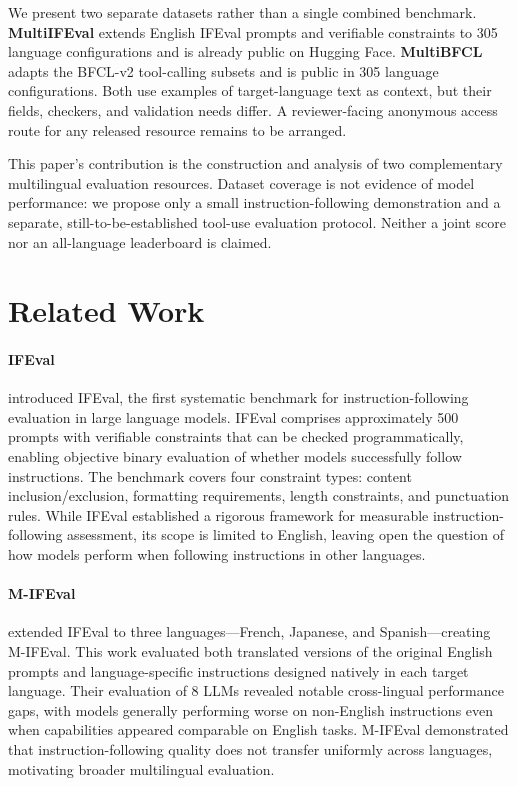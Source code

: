 \documentclass[11pt]{article}
\begin{document}
We present two separate datasets rather than a single combined benchmark.
\textbf{MultiIFEval} extends English IFEval prompts and verifiable constraints to
305 language configurations and is already public on Hugging Face.
\textbf{MultiBFCL} adapts the BFCL-v2 tool-calling subsets and is public in
305 language configurations. Both use examples of target-language text as
context, but their fields, checkers, and validation needs differ. A reviewer-facing
anonymous access route for any released resource remains to be arranged.

This paper's contribution is the construction and analysis of two complementary
multilingual evaluation resources. Dataset coverage is not evidence of model
performance: we propose only a small instruction-following demonstration and a
separate, still-to-be-established tool-use evaluation protocol. Neither a joint
score nor an all-language leaderboard is claimed.


\section{Related Work}
\label{sec:related-work}

\paragraph{IFEval}
\cite{zhou2023ifeval} introduced IFEval, the first systematic benchmark for instruction-following evaluation in large language models. IFEval comprises approximately 500 prompts with verifiable constraints that can be checked programmatically, enabling objective binary evaluation of whether models successfully follow instructions. The benchmark covers four constraint types: content inclusion/exclusion, formatting requirements, length constraints, and punctuation rules. While IFEval established a rigorous framework for measurable instruction-following assessment, its scope is limited to English, leaving open the question of how models perform when following instructions in other languages.

\paragraph{M-IFEval}
\cite{dussolle-etal-2025-ifeval} extended IFEval to three languages---French, Japanese, and Spanish---creating M-IFEval. This work evaluated both translated versions of the original English prompts and language-specific instructions designed natively in each target language. Their evaluation of 8 LLMs revealed notable cross-lingual performance gaps, with models generally performing worse on non-English instructions even when capabilities appeared comparable on English tasks. M-IFEval demonstrated that instruction-following quality does not transfer uniformly across languages, motivating broader multilingual evaluation.
\end{document}
